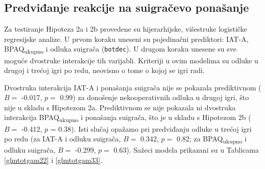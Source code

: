 \documentclass[a4paper, 12pt]{report}
\begin{document}
\subsection{Predviđanje reakcije na suigračevo ponašanje}

Za testiranje Hipoteza 2a i 2b provedene su hijerarhijske, višestruke logističke
regresijske analize. U prvom koraku uneseni su pojedinačni prediktori: IAT-A,
BPAQ\textsubscript{ukupno} i odluka suigrača (\texttt{botdec}). U drugom koraku
unesene su sve moguće dvostruke interakcije tih varijabli. Kriteriji u ovim
modelima su odluke u drugoj i trećoj igri po redu, neovisno o tome o kojoj se
igri radi.

Dvostruka interakcija IAT-A i ponašanja suigrača nije se pokazala prediktivnom
($B =$ -0.017, $p =$ 0.99)
za donošenje nekooperativnih odluka u drugoj igri, što nije u skladu s Hipotezom
2a. Prediktivnom se nije pokazala ni dvostruka interakcija BPAQ\textsubscript{ukupno}
i ponašanja suigrača, što je u skladu s Hipotezom 2b ($B =$ -0.412, $p $ = 0.38).
Isti slučaj opažamo pri predviđanju odluke u trećoj igri po redu (za IAT-A i
odluku suigrača, $B =$ 0.342, $p =$ 0.82; za BPAQ\textsubscript{ukupno} i odluku
suigrača, $B =$ -0.299, $p =$ 0.63). Sažeci modela prikazani su u Tablicama
\ref{glmtotgam22} i \ref{glmtotgam33}.
\end{document}
